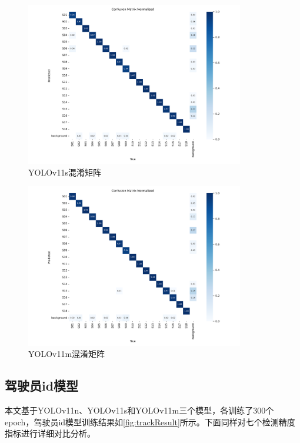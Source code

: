 \begin{figure}[h]
    \centering
    \includegraphics[width=0.85\textwidth]{figs/chap04/s_confusion_matrix_normalized.png}
    \caption{YOLOv11s混淆矩阵}
    \label{fig:smatrix}
\end{figure}


\begin{figure}[H]
    \centering
    \includegraphics[width=0.85\textwidth]{figs/chap04/m_confusion_matrix_normalized.png}
    \caption{YOLOv11m混淆矩阵}
    \label{fig:mmatrix}
\end{figure}

\subsection{驾驶员id模型}
本文基于YOLOv11n、YOLOv11s和YOLOv11m三个模型，各训练了300个epoch，驾驶员id模型训练结果如\ref{fig:trackResult}所示。下面同样对七个检测精度指标进行详细对比分析。

